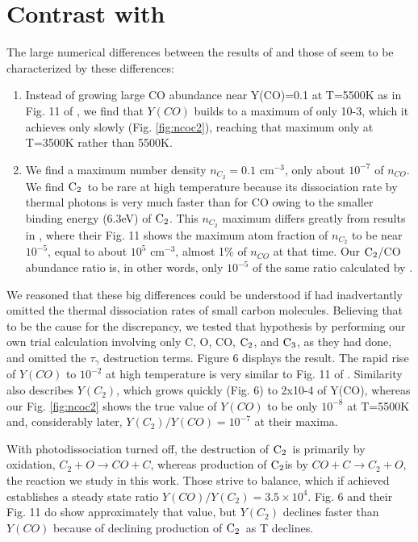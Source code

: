 \documentclass[manuscript]{aastex}
\newcommand{\ctwo}{${\rm C}_2$}
\newcommand{\cthree}{${\rm C}_3$}
\begin{document}
\section{Contrast with \citet{2009ApJ...703..642C}}

The large numerical differences between the results of
\citet{1999Sci...283.1290C,2001ApJ...562..480C}
and those of \citet{2009ApJ...703..642C}
seem to be characterized by these differences:
\begin{enumerate}

\item Instead of growing large CO abundance near Y(CO)=0.1 at T=5500K
as in Fig. 11 of \citet{2009ApJ...703..642C}, we find that $Y(CO)$
builds to a maximum of only 10-3, which it achieves only slowly
(Fig. \ref{fig:ncoc2}), reaching that maximum only at T=3500K rather
than 5500K.

\item We find a maximum number density $n_{C_2} = 0.1$ cm$^{-3}$,
only about $10^{-7}$ of
$n_{CO}$. We find \ctwo\ to be rare at high temperature because its
dissociation rate by thermal photons is very much faster than for CO
owing to the smaller binding energy (6.3eV) of \ctwo. This $n_{C_2}$
maximum differs greatly from results in \citet{2009ApJ...703..642C},
where their Fig. 11 shows the maximum atom fraction of $n_{C_2}$ to be
near $10^{-5}$, equal to about $10^5$ cm$^{-3}$, almost 1\% of
$n_{CO}$ at that time. Our \ctwo/CO abundance ratio is,
in other words, only $10^{-5}$ of the same ratio calculated by
\citet{2009ApJ...703..642C}.

\end{enumerate}
We reasoned that these big differences could be understood if
\citet{2009ApJ...703..642C} had inadvertantly omitted the thermal
dissociation rates of small carbon molecules. Believing that to be the
cause for the discrepancy, we tested that hypothesis by performing our
own trial calculation involving only C, O, CO, \ctwo, and \cthree,
as they had done,
and omitted the $\tau_\gamma$ destruction terms.
Figure 6 displays the result.
The rapid rise of $Y(CO)$ to $10^{-2}$ at high temperature is very similar to
Fig. 11 of \citet{2009ApJ...703..642C}.
Similarity also describes $Y(C_2)$,
which grows quickly (Fig. 6) to 2x10-4 of Y(CO),
whereas our Fig. \ref{fig:ncoc2} shows the true value of $Y(CO)$ to be
only $10^{-8}$ at T=5500K and, considerably later,
$Y(C_2)/Y(CO) = 10^{-7}$ at their maxima. 

With photodissociation turned off, the destruction of \ctwo\ is primarily
by oxidation, $C_2+O \to CO + C$, whereas production of \ctwo is by
$CO + C \to C_2 + O$, the reaction we study in this work.
Those strive to balance, which if achieved establishes a steady state
ratio $Y(CO)/Y(C_2) = 3.5 \times 10^4$. Fig. 6 and their Fig. 11 do show
approximately that value, but $Y(C_2)$ declines faster than $Y(CO)$
because of declining production of \ctwo\ as T declines.
\end{document}
